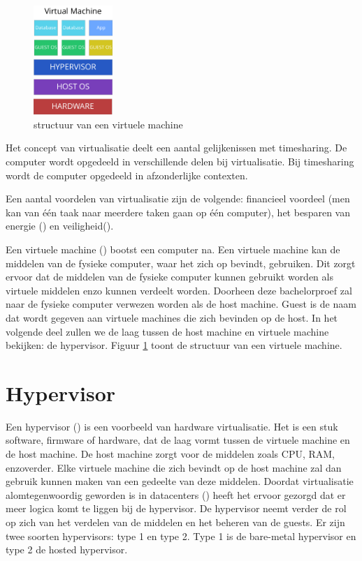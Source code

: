 \begin{figure}
    \centering
    \includegraphics[width=3cm]{img/virtual-machine}
    \caption{structuur van een virtuele machine}
    \label{fig:virtualmachine}
\end{figure}

Het concept van virtualisatie deelt een aantal gelijkenissen met timesharing. De computer wordt opgedeeld in verschillende delen bij virtualisatie. Bij timesharing wordt de computer opgedeeld in afzonderlijke contexten.

Een aantal voordelen van virtualisatie zijn de volgende: financieel voordeel (men kan van één taak naar meerdere taken gaan op één computer), het besparen van energie (\cite{beloglazov_energy_2010}) en veiligheid(\cite{mortleman_security_2009}).

Een virtuele machine (\cite{smith_architecture_2005}) bootst een computer na. Een virtuele machine kan de middelen van de fysieke computer, waar het zich op bevindt, gebruiken. Dit zorgt ervoor dat de middelen van de fysieke computer kunnen gebruikt worden als virtuele middelen enzo kunnen verdeelt worden. Doorheen deze bachelorproef zal naar de fysieke computer verwezen worden als de host machine. Guest is de naam dat wordt gegeven aan virtuele machines die zich bevinden op de host. In het volgende deel zullen we de laag tussen de host machine en virtuele machine bekijken: de hypervisor. Figuur \ref{fig:virtualmachine} toont de structuur van een virtuele machine. 

\section{Hypervisor}

Een hypervisor (\cite{popek_formal_1974}) is een voorbeeld van hardware virtualisatie. Het is een stuk software, firmware of hardware, dat de laag vormt tussen de virtuele machine en de host machine. De host machine zorgt voor de middelen zoals CPU, RAM, enzoverder. Elke virtuele machine die zich bevindt op de host machine zal dan gebruik kunnen maken van een gedeelte van deze middelen. Doordat virtualisatie alomtegenwoordig geworden is in datacenters (\cite{soundararajan_impact_2010}) heeft het ervoor gezorgd dat er meer logica komt te liggen bij de hypervisor. De hypervisor neemt verder de rol op zich van het verdelen van de middelen en het beheren van de guests. Er zijn twee soorten hypervisors: type 1 en type 2. Type 1 is de bare-metal hypervisor en type 2 de hosted hypervisor.

